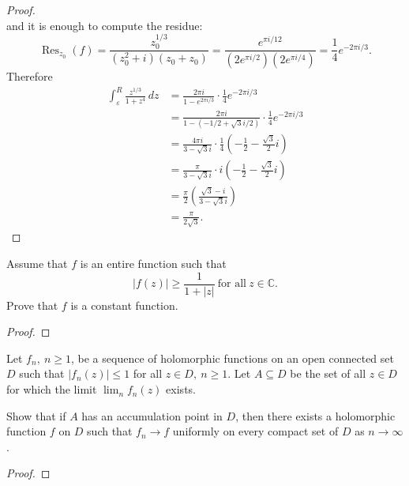 \documentclass{article}
\newenvironment{problem}[2][Problem]{\begin{trivlist}
\item[\hskip \labelsep {\bfseries #1}\hskip \labelsep {\bfseries #2.}]}{\end{trivlist}}
\begin{document}
\begin{proof}
\[  \] and it is enough to compute the residue: \[
    \operatorname{Res}_{z_0}(f)
    = \frac{z_0^{1/3}}{(z_0^2 + i)(z_0 + z_0)}
    = \frac{e^{\pi i/12}}{(2e^{\pi i/2})(2e^{\pi i/4})}
    = \frac{1}{4} e^{-2\pi i/3}.
  \]
  Therefore \begin{align*}
    \int_\varepsilon^R\frac{z^{1/3}}{1 + {z^4}}\,dz
    &= \frac{2\pi i}{1 - e^{2\pi i/3}}\cdot\frac{1}{4} e^{-2\pi i/3}\\
    &= \frac{2\pi i}{1 - (-1/2 + \sqrt{3}i/2)}\cdot\frac{1}{4} e^{-2\pi i/3}\\
    &= \frac{4\pi i}{3 - \sqrt{3}i} \cdot\frac{1}{4}\left(-\frac{1}{2} - \frac{\sqrt{3}}{2}i\right)\\
    &= \frac{\pi}{3 - \sqrt{3}i} \cdot i\left(-\frac{1}{2} - \frac{\sqrt{3}}{2}i\right)\\
    &= \frac{\pi}{2} \left(\frac{\sqrt3-i}{3 - \sqrt{3}i}\right)\\
    &= \frac{\pi}{2\sqrt3}.
  \end{align*}
\end{proof}
\pagebreak

\begin{problem}{2}
  Assume that $f$ is an entire function such that \[
    |f(z)| \geq \frac{1}{1 + |z|}\ \text{for all}\ z \in \mathbb C.
  \] Prove that $f$ is a constant function.
\end{problem}

\begin{proof}
\end{proof}

\pagebreak

\begin{problem}{3}
  Let $f_n,\ n \geq 1$, be a sequence of holomorphic functions on an open
  connected set $D$ such that $|f_n(z)| \leq 1$ for all $z \in D,\ n \geq 1$.
  Let $A \subseteq D$ be the set of all $z \in D$ for which the limit
  $\lim_n f_n(z)$ exists.

  Show that if $A$ has an accumulation point in $D$, then there exists a
  holomorphic function $f$ on $D$ such that $f_n \rightarrow f$ uniformly on
  every compact set of $D$ as $n \rightarrow \infty$.
\end{problem}

\begin{proof}
\end{proof}
\end{document}

